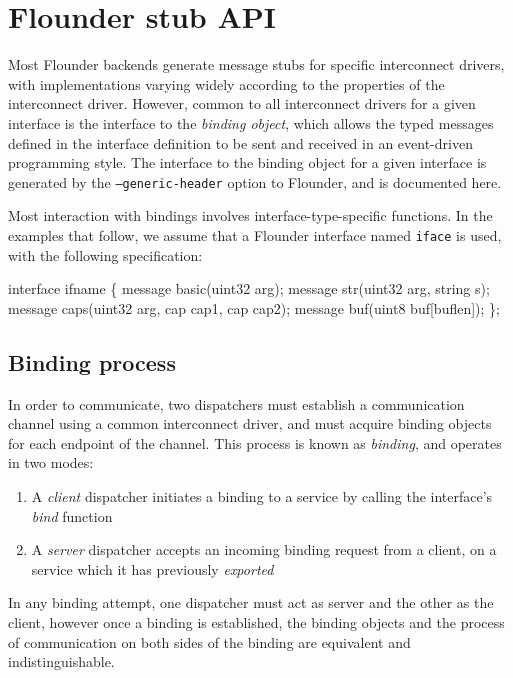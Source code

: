 \documentclass[a4paper,twoside]{report} %
\begin{document}
\chapter{Flounder stub API}

Most Flounder backends generate message stubs for specific interconnect
drivers, with implementations varying widely according to the properties of
the interconnect driver. However, common to all interconnect drivers for a
given interface is the interface to the \emph{binding object}, which allows
the typed messages defined in the interface definition to be sent and received
in an event-driven programming style. The interface to the binding object for
a given interface is generated by the \texttt{--generic-header} option to
Flounder, and is documented here.

Most interaction with bindings involves interface-type-specific functions.
In the examples that follow, we assume that a Flounder interface
named \texttt{iface} is used, with the following specification:

\begin{example}
interface ifname \{
  message basic(uint32 arg);
  message str(uint32 arg, string s);
  message caps(uint32 arg, cap cap1, cap cap2);
  message buf(uint8 buf[buflen]);
\};
\end{example}


\section{Binding process}\label{sec:binding_bindingproc}

In order to communicate, two dispatchers must establish a communication channel
using a common interconnect driver, and must acquire binding objects for each
endpoint of the channel. This process is known as \emph{binding}, and operates
in two modes:

\begin{enumerate}
 \item A \emph{client} dispatcher initiates a binding to a service by calling
       the interface's \emph{bind} function
 \item A \emph{server} dispatcher accepts an incoming binding request from a
       client, on a service which it has previously \emph{exported}
\end{enumerate}

In any binding attempt, one dispatcher must act as server and the other as
the client, however once a binding is established, the binding objects and the
process of communication on both sides of the binding are equivalent and
indistinguishable.
\end{document}
